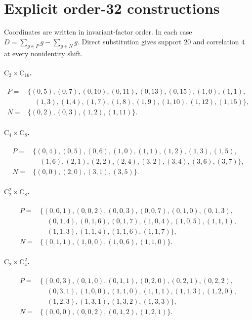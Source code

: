 \documentclass[11pt]{article}
\theoremstyle{remark}
\newcommand{\C}{\mathrm{C}}
\begin{document}
\appendix
\section{Explicit order-32 constructions}\label{app:witnesses}

Coordinates are written in invariant-factor order.  In each case
$D=\sum_{g\in P}g-\sum_{g\in N}g$.  Direct substitution gives support $20$
and correlation $4$ at every nonidentity shift.

\paragraph{$\C_2\times\C_{16}$.}
\begin{align*}
P={}&\{(0,5),(0,7),(0,10),(0,11),(0,13),(0,15),(1,0),(1,1),\\
&\quad (1,3),(1,4),(1,7),(1,8),(1,9),(1,10),(1,12),(1,15)\},\\
N={}&\{(0,2),(0,3),(1,2),(1,11)\}.
\end{align*}

\paragraph{$\C_4\times\C_8$.}
\begin{align*}
P={}&\{(0,4),(0,5),(0,6),(1,0),(1,1),(1,2),(1,3),(1,5),\\
&\quad (1,6),(2,1),(2,2),(2,4),(3,2),(3,4),(3,6),(3,7)\},\\
N={}&\{(0,0),(2,0),(3,1),(3,5)\}.
\end{align*}

\paragraph{$\C_2^2\times\C_8$.}
\begin{align*}
P={}&\{(0,0,1),(0,0,2),(0,0,3),(0,0,7),(0,1,0),(0,1,3),\\
&\quad (0,1,4),(0,1,6),(0,1,7),(1,0,4),(1,0,5),(1,1,1),\\
&\quad (1,1,3),(1,1,4),(1,1,6),(1,1,7)\},\\
N={}&\{(0,1,1),(1,0,0),(1,0,6),(1,1,0)\}.
\end{align*}

\paragraph{$\C_2\times\C_4^2$.}
\begin{align*}
P={}&\{(0,0,3),(0,1,0),(0,1,1),(0,2,0),(0,2,1),(0,2,2),\\
&\quad (0,3,1),(1,0,0),(1,1,0),(1,1,1),(1,1,3),(1,2,0),\\
&\quad (1,2,3),(1,3,1),(1,3,2),(1,3,3)\},\\
N={}&\{(0,0,0),(0,0,2),(0,1,2),(1,2,1)\}.
\end{align*}
\end{document}
